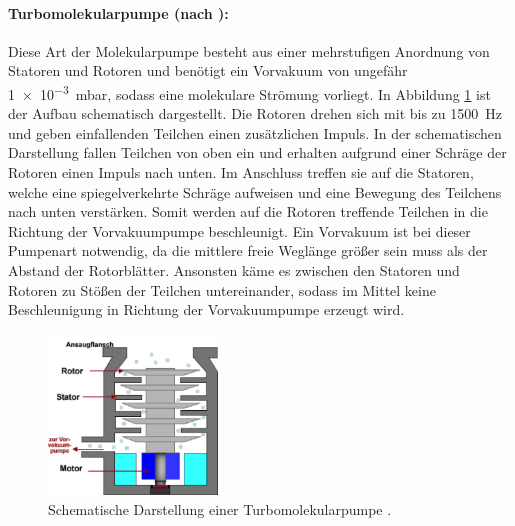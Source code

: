 \paragraph{Turbomolekularpumpe (nach \cite{pfeiffer}):}
Diese Art der Molekularpumpe besteht aus einer mehrstufigen Anordnung von Statoren und Rotoren
und benötigt ein Vorvakuum von ungefähr
\SI[retain-unity-mantissa=false]{1e-3}{\milli\bar},
sodass eine molekulare Strömung vorliegt.
In Abbildung \ref{fig:TMP} ist der Aufbau schematisch dargestellt.
Die Rotoren drehen sich mit bis zu \SI{1500}{\hertz} und geben einfallenden
Teilchen einen zusätzlichen Impuls.
In der schematischen Darstellung fallen Teilchen von oben ein und erhalten
aufgrund einer Schräge der Rotoren einen Impuls nach unten.
Im Anschluss treffen sie auf die Statoren,
welche eine spiegelverkehrte Schräge aufweisen und eine Bewegung des Teilchens
nach unten verstärken.
Somit werden auf die Rotoren treffende Teilchen
in die Richtung der Vorvakuumpumpe beschleunigt.
Ein Vorvakuum ist bei dieser Pumpenart notwendig,
da die mittlere freie Weglänge größer sein muss als der Abstand der Rotorblätter.
Ansonsten käme es zwischen den Statoren und Rotoren zu Stößen der Teilchen untereinander,
sodass im Mittel keine Beschleunigung in Richtung der Vorvakuumpumpe erzeugt wird.
\begin{figure}
  \centering
  \includegraphics[width=0.4\textwidth]{TMP.JPG}
  \caption{Schematische Darstellung einer Turbomolekularpumpe \cite{TMP}.}
  \label{fig:TMP}
\end{figure}
\FloatBarrier

